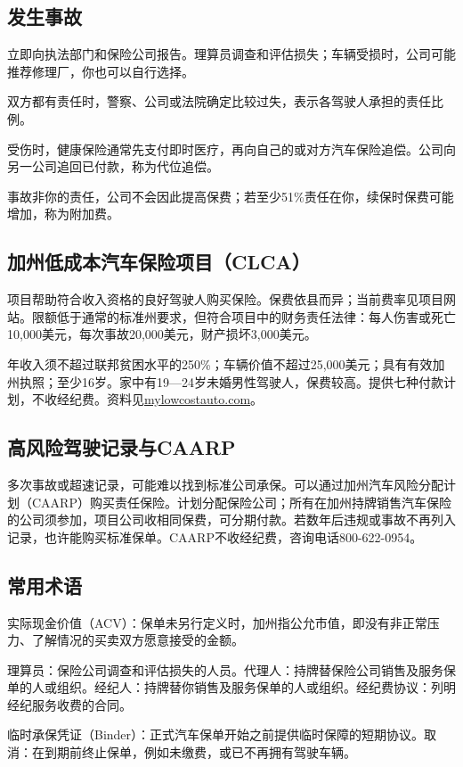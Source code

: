 \documentclass[UTF8,fontset=none,11pt,a4paper]{ctexart}
\begin{document}
\subsection*{发生事故}
立即向执法部门和保险公司报告。理算员调查和评估损失；车辆受损时，公司可能推荐修理厂，你也可以自行选择。


双方都有责任时，警察、公司或法院确定比较过失，表示各驾驶人承担的责任比例。


受伤时，健康保险通常先支付即时医疗，再向自己的或对方汽车保险追偿。公司向另一公司追回已付款，称为代位追偿。


事故非你的责任，公司不会因此提高保费；若至少51\%责任在你，续保时保费可能增加，称为附加费。


\subsection*{加州低成本汽车保险项目（CLCA）}
项目帮助符合收入资格的良好驾驶人购买保险。保费依县而异；当前费率见项目网站。限额低于通常的标准州要求，但符合项目中的财务责任法律：每人伤害或死亡10,000美元，每次事故20,000美元，财产损坏3,000美元。


年收入须不超过联邦贫困水平的250\%；车辆价值不超过25,000美元；具有有效加州执照；至少16岁。家中有19—24岁未婚男性驾驶人，保费较高。提供七种付款计划，不收经纪费。资料见\url{mylowcostauto.com}。


\subsection*{高风险驾驶记录与CAARP}
多次事故或超速记录，可能难以找到标准公司承保。可以通过加州汽车风险分配计划（CAARP）购买责任保险。计划分配保险公司；所有在加州持牌销售汽车保险的公司须参加，项目公司收相同保费，可分期付款。若数年后违规或事故不再列入记录，也许能购买标准保单。CAARP不收经纪费，咨询电话800-622-0954。


\subsection*{常用术语}
实际现金价值（ACV）：保单未另行定义时，加州指公允市值，即没有非正常压力、了解情况的买卖双方愿意接受的金额。


理算员：保险公司调查和评估损失的人员。代理人：持牌替保险公司销售及服务保单的人或组织。经纪人：持牌替你销售及服务保单的人或组织。经纪费协议：列明经纪服务收费的合同。


临时承保凭证（Binder）：正式汽车保单开始之前提供临时保障的短期协议。取消：在到期前终止保单，例如未缴费，或已不再拥有驾驶车辆。
\end{document}
